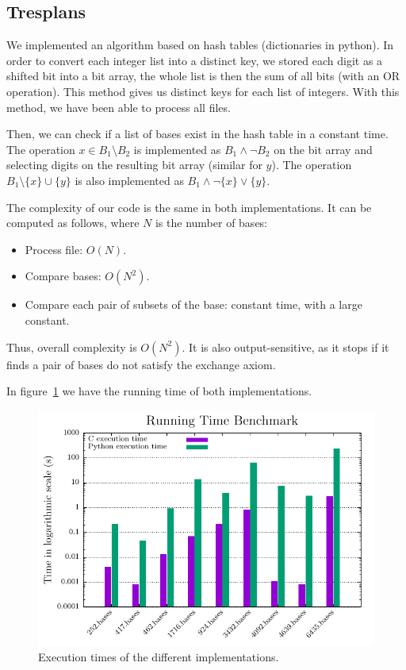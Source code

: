 \documentclass[11pt]{amsart}
\begin{document}
\subsection{Tresplans}

We implemented an algorithm based on hash tables (dictionaries in python).
In order to convert each integer list into a distinct key,
we stored each digit as a shifted bit into a bit array,
the whole list is then the sum of all bits (with an OR operation).
This method gives us distinct keys for each list of integers.
With this method,
we have been able to process all files.

Then, we can check if a list of bases exist in the hash table in a constant time.
The operation
\(x \in B_1 \setminus B_2\)
is implemented as
\(B_1 \land \neg B_2\)
on the bit array and selecting digits on the resulting bit array
(similar for \(y\)).
The operation
\(B_1 \setminus \{x\} \cup \{y\}\)
is also implemented as
\(B_1 \land \neg \{x\} \lor \{y\}\).

The complexity of our code is the same in both implementations.
It can be computed as follows, where $N$ is the number of bases:

\begin{itemize}
 \item Process file: $O(N)$.
 \item Compare bases: $O(N^2)$.
 \item Compare each pair of subsets of the base:
       constant time, with a large constant.
\end{itemize}

Thus, overall complexity is $O(N^2)$.
It is also output-sensitive,
as it stops if it finds a pair of bases do not satisfy the exchange axiom.

In figure~\ref{fig:Tresplans} we have the running time of both implementations.

\begin{figure}[h!]
    \centering
    \includegraphics[width=.75\textwidth]{./Tresplans/Tresplans_exec_time.pdf}
    \caption{Execution times of the different implementations.
    \label{fig:Tresplans}}
\end{figure}
\end{document}
